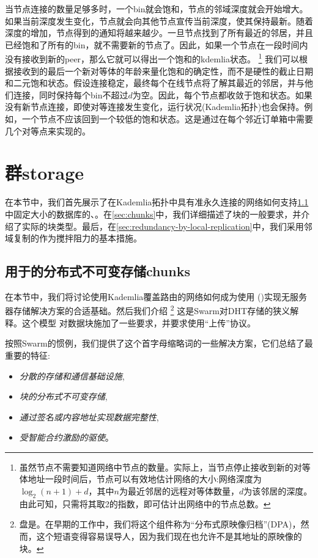 当节点连接的数量足够多时，一个bin就会饱和，节点的邻域深度就会开始增大。如果当前深度发生变化，节点就会向其他节点宣传当前深度，使其保持最新。随着深度的增加，节点得到的通知将越来越少。一旦节点找到了所有最近的邻居，并且已经饱和了所有的bin，就不需要新的节点了。因此，如果一个节点在一段时间内没有接收到新的peer，那么它就可以得出一个饱和的kdemlia状态。%
%
\footnote{虽然节点不需要知道网络中节点的数量。实际上，当节点停止接收到新的对等体地址一段时间后，节点可以有效地估计网络的大小:网络深度为$\log_2(n+1)+ d$，其中$n$为最近邻居的远程对等体数量，$d$为该邻居的深度。由此可知，只需将其取2的指数，即可估计出网络中的节点总数。}
%
我们可以根据接收到的最后一个新对等体的年龄来量化饱和的确定性，而不是硬性的截止日期和二元饱和状态。假设连接稳定，最终每个在线节点将了解其最近的邻居，并与他们连接，同时保持每个bin不超过$d$为空。因此，每个节点都收敛于饱和状态。如果没有新节点连接，即使对等连接发生变化，运行状况(Kademlia拓扑)也会保持。例如，一个节点不应该回到一个较低的饱和状态。这是通过在每个邻近订单箱中需要几个对等点来实现的。 

\section{群storage\statusgreen}\label{sec:kademlia-storage}

在本节中，我们首先展示了在Kademlia拓扑中具有准永久连接的网络如何支持\ref{sec:disc}中固定大小的数据库的、。在\ref{sec:chunks}中，我们详细描述了块的一般要求，并介绍了实际的块类型。最后，在\ref{sec:redundancy-by-local-replication}中，我们采用邻域复制的作为搅拌阻力的基本措施。

\subsection{用于的分布式不可变存储chunks\statusgreen}\label{sec:disc}
 
在本节中，我们将讨论使用Kademlia覆盖路由的网络如何成为使用 ()实现无服务器存储解决方案的合适基础。然后我们介绍%
%
\footnote{盘是。在早期的工作中，我们将这个组件称为“分布式原映像归档”(DPA)，然而，这个短语变得容易误导人，因为我们现在也允许不是其地址的原映像的块。}
% 
这是Swarm对DHT存储的狭义解释。这个模型 
对数据块施加了一些要求，并要求使用“上传”协议。 

按照Swarm的惯例，我们提供了这个首字母缩略词的一些解决方案，它们总结了最重要的特征:


\begin{itemize}
\item \emph{分散的存储和通信基础设施}, 
\item \emph{块的分布式不可变存储}, 
\item \emph{通过签名或内容地址实现数据完整性},
\item \emph{受智能合约激励的驱使}。 

\end{itemize}
 
